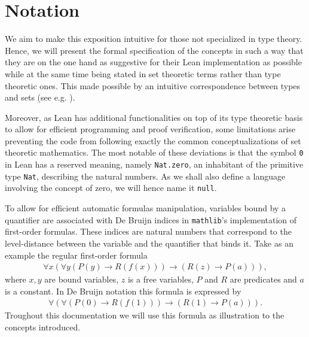 \chapter{Notation}\label{subsec:notation}
We aim to make this exposition intuitive for those not specialized in type theory. Hence, we will present the formal specification of the concepts in such a way that they are on the one hand as suggestive for their Lean implementation as possible while at the same time being stated in set theoretic terms rather than type theoretic ones. This made possible by an intuitive correspondence between types and sets (see e.g. \cite{nederpelt:1994}).

Moreover, as Lean has additional functionalities on top of its type theoretic basis to allow for efficient programming and proof verification, some limitations arise preventing the code from following exactly the common conceptualizations of set theoretic mathematics. The most notable of these deviations is that the symbol \texttt{0} in Lean has a reserved meaning, namely \texttt{Nat.zero}, an inhabitant of the primitive type \texttt{Nat}, describing the natural numbers. As we shall also define a language involving the concept of zero, we will hence name it \texttt{null}.

To allow for efficient automatic formulas manipulation, variables bound by a quantifier are associated with De Bruijn \cite{bruijn:1972} indices in \texttt{mathlib}'s implementation of first-order formulas. These indices are natural numbers that correspond to the level-distance between the variable and the quantifier that binds it. Take as an example the regular first-order formula 
\begin{align}
    \forall x (\forall y (P(y) \to R(f(x))) \to (R(z) \to P(a))),
\end{align} where $x, y$ are bound variables, $z$ is a free variables, $P$ and $R$ are predicates and $a$ is a constant.
In De Bruijn notation this formula is expressed by
\begin{align}\label{fml:db}
    \forall (\forall (P(0) \to R(f(1))) \to (R(1) \to P(a))).
\end{align}
Troughout this documentation we will use this formula as illustration to the concepts introduced.

